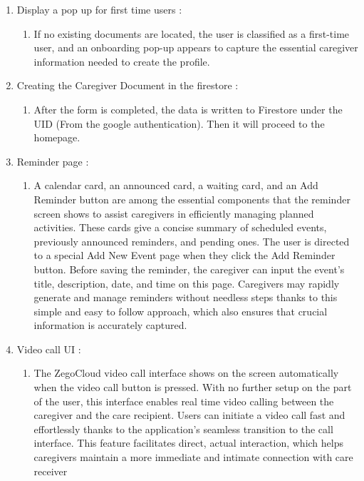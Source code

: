 \begin{enumerate}[leftmargin=2.2cm]
\begin{enumerate}[leftmargin=1.2cm, label=\arabic*.]
		\item Display a pop up for first time users :
		\begin{enumerate}[label=\alph*.] 
			\item If no existing documents are located, the user is classified as a first-time user, and an onboarding pop-up appears to capture the essential caregiver information needed to create the profile.
		\end{enumerate}
	
		\item Creating the Caregiver Document in the firestore :
		\begin{enumerate}[label=\alph*.] 
			\item After the form is completed, the data is written to Firestore under the UID (From the google authentication). Then it will proceed to the homepage.
		\end{enumerate}
		
	
		\item Reminder page :
		\begin{enumerate}[label=\alph*.] 
			\item A calendar card, an announced card, a waiting card, and an Add Reminder button are among the essential components that the reminder screen shows to assist caregivers in efficiently managing planned activities. These cards give a concise summary of scheduled events, previously announced reminders, and pending ones. The user is directed to a special Add New Event page when they click the Add Reminder button. Before saving the reminder, the caregiver can input the event's title, description, date, and time on this page. Caregivers may rapidly generate and manage reminders without needless steps thanks to this simple and easy to follow approach, which also ensures that crucial information is accurately captured. 
		\end{enumerate}
	
		\item Video call UI :
		\begin{enumerate}[label=\alph*.] 
			\item The ZegoCloud video call interface shows on the screen automatically when the video call button is pressed. With no further setup on the part of the user, this interface enables real time video calling between the caregiver and the care recipient. Users can initiate a video call fast and effortlessly thanks to the application's seamless transition to the call interface. This feature facilitates direct, actual interaction, which helps caregivers maintain a more immediate and intimate connection with care receiver
		\end{enumerate}
	

\end{enumerate}
\end{enumerate}
